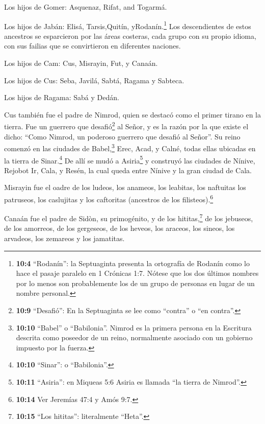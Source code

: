  Los hijos de Gomer: Asquenaz, Rifat, and Togarmá.

 Los hijos de Jabán: Elisá, Tarsis,Quitín,
yRodanín.\footnote{\textbf{10:4} ``Rodanín'': la Septuaginta presenta la
  ortografía de Rodanín como lo hace el pasaje paralelo en 1 Crónicas
  1:7. Nótese que los dos últimos nombres por lo menos son probablemente
  los de un grupo de personas en lugar de un nombre personal.}
 Los descendientes de estos ancestros se esparcieron por las
áreas costeras, cada grupo con su propio idioma, con sus failias que se
convirtieron en diferentes naciones.

 Los hijos de Cam: Cus, Misrayin, Fut, y Canaán.

 Los hijos de Cus: Seba, Javilá, Sabtá, Ragama y Sabteca.

Los hijos de Ragama: Sabá y Dedán.

 Cus también fue el padre de Nimrod, quien se destacó como
el primer tirano en la tierra.  Fue un guerrero que
desafió\footnote{\textbf{10:9} ``Desafió'': En la Septuaginta se lee
  como ``contra'' o ``en contra''.} al Señor, y es la razón por la que
existe el dicho: ``Como Nimrod, un poderoso guerrero que desafió al
Señor''.  Su reino comenzó en las ciudades de
Babel,\footnote{\textbf{10:10} ``Babel'' o ``Babilonia''. Nimrod es la
  primera persona en la Escritura descrita como poseedor de un reino,
  normalmente asociado con un gobierno impuesto por la fuerza.} Erec,
Acad, y Calné, todas ellas ubicadas en la tierra de Sinar.\footnote{\textbf{10:10}
  ``Sinar'': o ``Babilonia''.}  De allí se mudó a
Asiria\footnote{\textbf{10:11} ``Asiria'': en Miqueas 5:6 Asiria es
  llamada ``la tierra de Nimrod''.} y construyó las ciudades de Nínive,
Rejobot Ir, Cala,  y Resén, la cual queda entre Nínive y la
gran ciudad de Cala.

 Misrayin fue el oadre de los ludeos, los anameos, los
leabitas, los naftuitas  los patruseos, los caslujitas y
los caftoritas (ancestros de los filisteos).\footnote{\textbf{10:14} Ver
  Jeremías 47:4 y Amós 9:7.}

 Canaán fue el padre de Sidòn, su primogénito, y de los
hititas,\footnote{\textbf{10:15} ``Los hititas'': literalmente ``Heta''.}
 de los jebuseos, de los amorreos, de los gergeseos,
 de los heveos, los araceos, los sineos,  los
arvadeos, los zemareos y los jamatitas.

